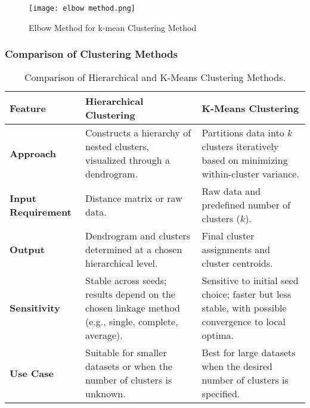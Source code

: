 \documentclass[a4paper,12pt]{article}
\begin{document}
\begin{figure} [H]
    \centering
    \texttt{[image: elbow method.png]}
    \caption{Elbow Method for k-mean Clustering Method}
    \label{fig:elbow_method}
\end{figure}


\subsubsection{Comparison of Clustering Methods}

\begin{table}[H]
\centering
\begin{tabular}{|l|p{6cm}|p{6cm}|}
\hline
\textbf{Feature}       & \textbf{Hierarchical Clustering}                          & \textbf{K-Means Clustering}                     \\ \hline
\textbf{Approach}      & Constructs a hierarchy of nested clusters, visualized through a dendrogram. & Partitions data into $k$ clusters iteratively based on minimizing within-cluster variance. \\ \hline
\textbf{Input Requirement} & Distance matrix or raw data.                            & Raw data and predefined number of clusters ($k$). \\ \hline
\textbf{Output}        & Dendrogram and clusters determined at a chosen hierarchical level. & Final cluster assignments and cluster centroids. \\ \hline
\textbf{Sensitivity}   & Stable across seeds; results depend on the chosen linkage method (e.g., single, complete, average). & Sensitive to initial seed choice; faster but less stable, with possible convergence to local optima. \\ \hline
\textbf{Use Case}      & Suitable for smaller datasets or when the number of clusters is unknown. & Best for large datasets when the desired number of clusters is specified. \\ \hline
\end{tabular}
\caption{Comparison of Hierarchical and K-Means Clustering Methods.}
\label{tab:clustering-comparison}
\end{table}
\end{document}
